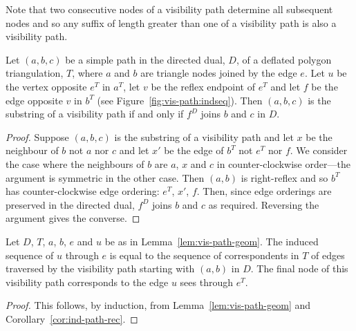 \documentclass[11pt]{amsart}
\begin{document}
Note that two consecutive nodes of a visibility path determine all
subsequent nodes and so any suffix of length greater than one of a
visibility path is also a visibility path.

\begin{lemma}
  \label{lem:vis-path-geom}
  Let $(a,b,c)$ be a simple path in the directed dual, $D$, of a
  deflated polygon triangulation, $T$, where $a$ and $b$ are triangle
  nodes joined by the edge $e$.  Let $u$ be the vertex opposite $e^T$
  in $a^T$, let $v$ be the reflex endpoint of $e^T$ and let $f$ be the
  edge opposite $v$ in $b^T$ (see Figure~\ref{fig:vis-path:indseq}).
  Then $(a,b,c)$ is the substring of a visibility path if and only if
  $f^D$ joins $b$ and $c$ in $D$.
\end{lemma}
\begin{proof}
  Suppose $(a,b,c)$ is the substring of a visibility path and let $x$
  be the neighbour of $b$ not $a$ nor $c$ and let $x'$ be the edge of
  $b^T$ not $e^T$ nor $f$. We consider the case where the neighbours
  of $b$ are $a$, $x$ and $c$ in counter-clockwise order---the
  argument is symmetric in the other case.  Then $(a,b)$ is
  right-reflex and so $b^T$ has counter-clockwise edge ordering:
  $e^T$, $x'$, $f$.  Then, since edge orderings are preserved in the
  directed dual, $f^D$ joins $b$ and $c$ as required.  Reversing the
  argument gives the converse.
\end{proof}

\begin{corollary}
  \label{cor:ind-path-vis}
  Let $D$, $T$, $a$, $b$, $e$ and $u$ be as in
  Lemma~\ref{lem:vis-path-geom}.  The induced sequence of $u$ through
  $e$ is equal to the sequence of correspondents in $T$ of edges
  traversed by the visibility path starting with $(a,b)$ in $D$.  The
  final node of this visibility path corresponds to the edge $u$ sees
  through $e^T$.
\end{corollary}
\begin{proof}
  This follows, by induction, from Lemma~\ref{lem:vis-path-geom} and
  Corollary~\ref{cor:ind-path-rec}.
\end{proof}
\end{document}
